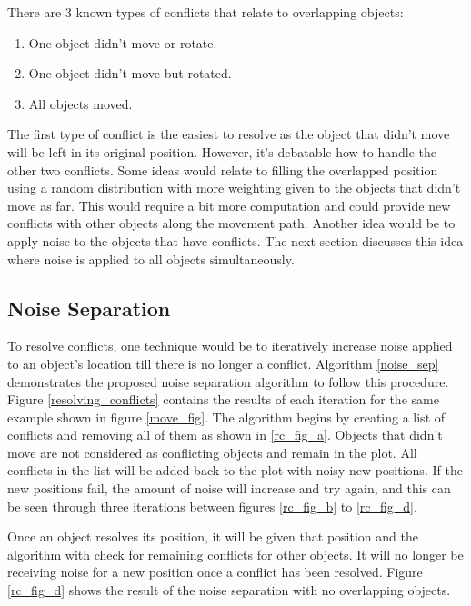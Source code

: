 \documentclass[sigconf,authordraft]{acmart}
\begin{document}
    There are 3 known types of conflicts that relate to overlapping objects:
    \begin{enumerate}
        \item One object didn't move or rotate.
        \item One object didn't move but rotated.
        \item All objects moved.
    \end{enumerate}
    The first type of conflict is the easiest to resolve as the object that didn’t move will be left in its original position. However, it’s debatable how to handle the other two conflicts. Some ideas would relate to filling the overlapped position using a random distribution with more weighting given to the objects that didn’t move as far. This would require a bit more computation and could provide new conflicts with other objects along the movement path. Another idea would be to apply noise to the objects that have conflicts. The next section discusses this idea where noise is applied to all objects simultaneously.
        
    \subsection{Noise Separation}
    To resolve conflicts, one technique would be to iteratively increase noise applied to an object’s location till there is no longer a conflict. Algorithm \ref{noise_sep} demonstrates the proposed noise separation algorithm to follow this procedure. Figure \ref{resolving_conflicts} contains the results of each iteration for the same example shown in figure \ref{move_fig}. The algorithm begins by creating a list of conflicts and removing all of them as shown in \ref{rc_fig_a}. Objects that didn’t move are not considered as conflicting objects and remain in the plot. All conflicts in the list will be added back to the plot with noisy new positions. If the new positions fail, the amount of noise will increase and try again, and this can be seen through three iterations between figures \ref{rc_fig_b} to \ref{rc_fig_d}. 

    Once an object resolves its position, it will be given that position and the algorithm with check for remaining conflicts for other objects. It will no longer be receiving noise for a new position once a conflict has been resolved. Figure \ref{rc_fig_d} shows the result of the noise separation with no overlapping objects.
\end{document}
